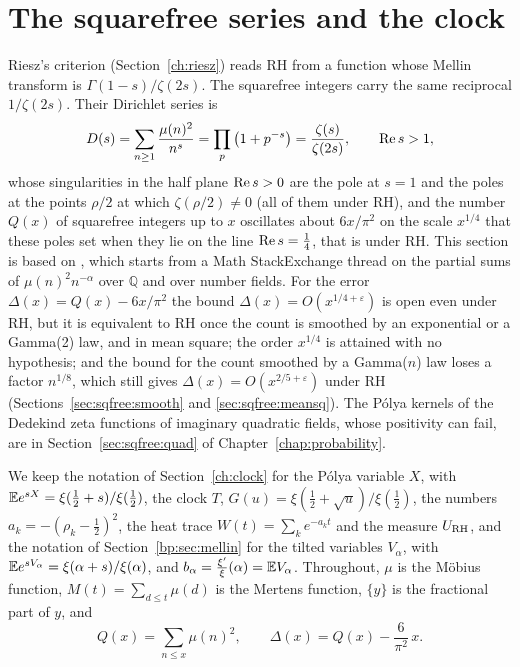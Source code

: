 \section{The squarefree series and the clock}\label{sec:sqfree}

Riesz's criterion (Section~\ref{ch:riesz}) reads RH from a function whose Mellin transform is $\Gamma(1-s)/\zeta(2s)$. The squarefree integers carry the same reciprocal $1/\zeta(2s)$. Their Dirichlet series is
\begin{equation}\label{eq:sqfree:D}
D(s)=\sum_{n\ge1}\frac{\mu(n)^2}{n^s}=\prod_p\big(1+p^{-s}\big)=\frac{\zeta(s)}{\zeta(2s)},\qquad\operatorname{Re} s>1,
\end{equation}
whose singularities in the half plane $\operatorname{Re} s>0$ are the pole at $s=1$ and the poles at the points $\rho/2$ at which $\zeta(\rho/2)\ne0$ (all of them under RH), and the number $Q(x)$ of squarefree integers up to $x$ oscillates about $6x/\pi^2$ on the scale $x^{1/4}$ that these poles set when they lie on the line $\operatorname{Re} s=\frac14$, that is under RH. This section is based on \cite{P26sqf}, which starts from a Math StackExchange thread \cite{MSE2063166} on the partial sums of $\mu(n)^2n^{-\alpha}$ over $\mathbb Q$ and over number fields. For the error $\Delta(x)=Q(x)-6x/\pi^2$ the bound $\Delta(x)=O(x^{1/4+\varepsilon})$ is open even under RH, but it is equivalent to RH once the count is smoothed by an exponential or a Gamma(2) law, and in mean square; the order $x^{1/4}$ is attained with no hypothesis; and the bound for the count smoothed by a Gamma($n$) law loses a factor $n^{1/8}$, which still gives $\Delta(x)=O(x^{2/5+\varepsilon})$ under RH (Sections~\ref{sec:sqfree:smooth} and \ref{sec:sqfree:meansq}). The P\'olya kernels of the Dedekind zeta functions of imaginary quadratic fields, whose positivity can fail, are in Section~\ref{sec:sqfree:quad} of Chapter~\ref{chap:probability}.

We keep the notation of Section~\ref{ch:clock} for the P\'olya variable $X$, with $\mathbb{E} e^{sX}=\xi(\frac12+s)/\xi(\frac12)$, the clock $T$, $G(u)=\xi(\frac12+\sqrt u)/\xi(\frac12)$, the numbers $a_k=-(\rho_k-\frac12)^2$, the heat trace $W(t)=\sum_ke^{-a_kt}$ and the measure $U_{\mathrm{RH}}$, and the notation of Section~\ref{bp:sec:mellin} for the tilted variables $V_\alpha$, with $\mathbb{E} e^{sV_\alpha}=\xi(\alpha+s)/\xi(\alpha)$, and $b_\alpha=\frac{\xi'}\xi(\alpha)=\mathbb{E} V_\alpha$. Throughout, $\mu$ is the M\"obius function, $M(t)=\sum_{d\le t}\mu(d)$ is the Mertens function, $\{y\}$ is the fractional part of $y$, and
\[
Q(x)=\sum_{n\le x}\mu(n)^2,\qquad \Delta(x)=Q(x)-\frac6{\pi^2}\,x .
\]


